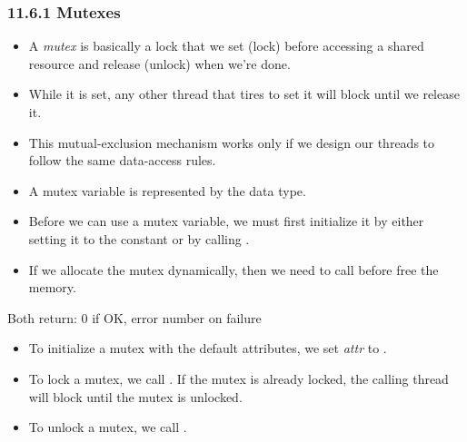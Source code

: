 \documentclass[]{article}
\begin{document}
\subsubsection*{11.6.1 Mutexes}
\begin{itemize}
\item A \emph{mutex} is basically a lock that we set (lock) before accessing a
shared resource and release (unlock) when we're done.
\item While it is set, any other thread that tires to set it will block until we
release it.
\item This mutual-exclusion mechanism works only if we design our threads to
follow the same data-access rules.
\item A mutex variable is represented by the  data type.
\item Before we can use a mutex variable, we must first initialize it by either
setting it to the constant  or by calling
.
\item If we allocate the mutex dynamically, then we need to call
 before free the memory.
\end{itemize}




Both return: 0 if OK, error number on failure

\begin{itemize}
\item To initialize a mutex with the default attributes, we set \emph{attr} to
.
\item To lock a mutex, we call . If the mutex is
already locked, the calling thread will block until the mutex is unlocked.
\item To unlock a mutex, we call .
\end{itemize}



\end{document}
